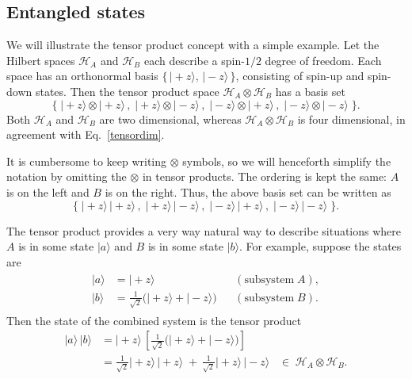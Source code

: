 \documentclass[pra,12pt]{revtex4}
\begin{document}

\subsection{Entangled states}

We will illustrate the tensor product concept with a simple example.
Let the Hilbert spaces $\mathscr{H}_A$ and $\mathscr{H}_B$ each
describe a spin-$1/2$ degree of freedom.  Each space has an
orthonormal basis $\{\,|\!+\!z\rangle, \,|\!-\!z\rangle \, \}$,
consisting of spin-up and spin-down states.  Then the tensor product
space $\mathscr{H}_A\otimes \mathscr{H}_B$ has a basis set
\begin{equation}
  \Big\{\;|\!+\!z\rangle\otimes|\!+\!z\rangle\,,\; |\!+\!z\rangle\otimes|\!-\!z\rangle\,,\; |\!-z\!\rangle\otimes|\!+\!z\rangle\,,\; |\!-\!z\rangle\otimes|\!-\!z\rangle \;\Big\}.
\end{equation}
Both $\mathscr{H}_A$ and $\mathscr{H}_B$ are two dimensional, whereas
$\mathscr{H}_A\otimes \mathscr{H}_B$ is four dimensional, in agreement
with Eq.~\eqref{tensordim}.

It is cumbersome to keep writing $\otimes$ symbols, so we will
henceforth simplify the notation by omitting the $\otimes$ in tensor
products.  The ordering is kept the same: $A$ is on the left and $B$
is on the right.  Thus, the above basis set can be written as
\begin{equation}
  \Big\{\;
  |\!+\!z\rangle\, |\!+\!z\rangle\,,\;
  |\!+\!z\rangle\, |\!-\!z\rangle\,,\;
  |\!-\!z\rangle\, |\!+\!z\rangle\,,\;
  |\!-\!z\rangle\, |\!-\!z\rangle \;\Big\}.
  \label{spin12}
\end{equation}

The tensor product provides a very way natural way to describe
situations where $A$ is in some state $|a\rangle$ and $B$ is in some
state $|b\rangle$.  For example, suppose the states are
\begin{align}
  \begin{aligned}
  |a\rangle &= |\!+\!z\rangle && (\textrm{subsystem}\;A),\\
  |b\rangle &= \frac{1}{\sqrt{2}}\Big(|\!+\!z\rangle + |\!-\!z\rangle\Big)
  && (\textrm{subsystem}\;B).
  \end{aligned}
\end{align}
Then the state of the combined system is the tensor product
\begin{align}
  |a\rangle\, |b\rangle
  &= |\!+\!z\rangle \, \left[\frac{1}{\sqrt{2}}\Big(|\!+\!z\rangle + |\!-\!z\rangle\Big)\right] \\
  &= \frac{1}{\sqrt{2}} |\!+\!z\rangle \, |\!+\!z\rangle
  \;+\, \frac{1}{\sqrt{2}} |\!+\!z\rangle\, |\!-\!z\rangle
  \;\;\;\in\; \mathscr{H}_A \otimes \mathscr{H}_B.
\end{align}
\end{document}
